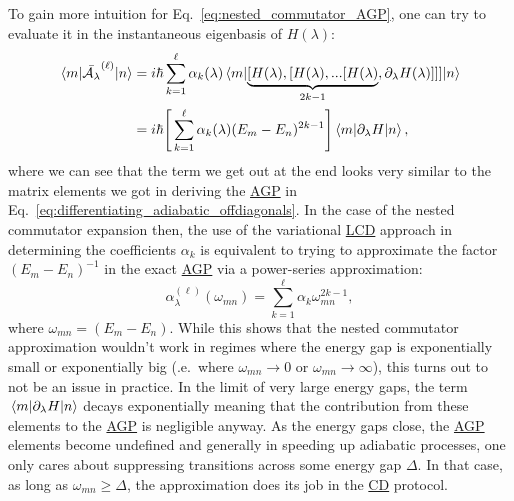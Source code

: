 \documentclass[a4paper,oneside,11pt]{book}
\newcommand{\dlambda}{\partial_{\lambda}}
\newcommand{\AGP}[1]{\mathcal{A}_{#1}}
\newcommand{\acrref}[1]{\hyperref[acr:#1]{#1}}
\begin{document}
    To gain more intuition for Eq.~\eqref{eq:nested_commutator_AGP}, one can try to evaluate it in the instantaneous eigenbasis of $H(\lambda)$:
    \begin{equation}\label{eq:nested_commutator_matrix_elements}
        \begin{aligned}
            \mel*{m}{\Bar{\AGP{\lambda}}^{(\ell)}}{n} &= i\hbar \sum_{k=1}^\ell \alpha_k(\lambda) \mel*{m}{\underbrace{[H(\lambda),[H(\lambda),...[H(\lambda)}_{2k-1},\dlambda H(\lambda)]]]}{n} \\
            &= i\hbar \Bigg[ \sum_{k=1}^\ell \alpha_k(\lambda)(E_m - E_n)^{2k - 1} \Bigg] \mel{m}{\dlambda H}{n},
        \end{aligned}
    \end{equation}
    where we can see that the term we get out at the end looks very similar to the matrix elements we got in deriving the \acrref{AGP} in Eq.~\eqref{eq:differentiating_adiabatic_offdiagonals}. In the case of the nested commutator expansion then, the use of the variational \acrref{LCD} approach in determining the coefficients $\alpha_k$ is equivalent to trying to approximate the factor $(E_m - E_n)^{- 1}$ in the exact \acrref{AGP} via a power-series approximation:
    \begin{equation}
        \alpha_{\lambda}^{(\ell)}(\omega_{mn}) = \sum_{k=1}^\ell \alpha_k \omega_{mn}^{2k - 1},
    \end{equation}
    where $\omega_{mn} = (E_m - E_n)$. While this shows that the nested commutator approximation wouldn't work in regimes where the energy gap is exponentially small or exponentially big (\@i.e.~where $\omega_{mn} \rightarrow 0$ or $\omega_{mn} \rightarrow \infty$), this turns out to not be an issue in practice. In the limit of very large energy gaps, the term $\mel{m}{\dlambda H}{n}$ decays exponentially meaning that the contribution from these elements to the \acrref{AGP} is negligible anyway. As the energy gaps close, the \acrref{AGP} elements become undefined and generally in speeding up adiabatic processes, one only cares about suppressing transitions across some energy gap $\Delta$. In that case, as long as $\omega_{mn} \geq \Delta$, the approximation does its job in the \acrref{CD} protocol.
\end{document}
